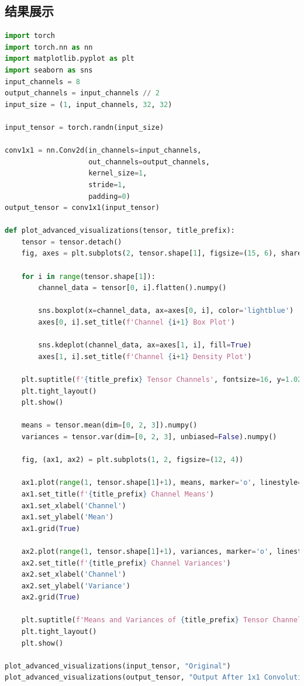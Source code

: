 \documentclass[a4paper,12pt]{article}
\begin{document}
\subsection{结果展示}
\begin{lstlisting}[language=Python]
import torch
import torch.nn as nn
import matplotlib.pyplot as plt
import seaborn as sns
input_channels = 8
output_channels = input_channels // 2  
input_size = (1, input_channels, 32, 32)  

input_tensor = torch.randn(input_size)

conv1x1 = nn.Conv2d(in_channels=input_channels, 
					out_channels=output_channels, 
					kernel_size=1, 
					stride=1, 
					padding=0)
output_tensor = conv1x1(input_tensor)

def plot_advanced_visualizations(tensor, title_prefix):
	tensor = tensor.detach() 
	fig, axes = plt.subplots(2, tensor.shape[1], figsize=(15, 6), sharex='col', gridspec_kw={'height_ratios': [1, 2]})

	for i in range(tensor.shape[1]):
		channel_data = tensor[0, i].flatten().numpy()

		sns.boxplot(x=channel_data, ax=axes[0, i], color='lightblue')
		axes[0, i].set_title(f'Channel {i+1} Box Plot')

		sns.kdeplot(channel_data, ax=axes[1, i], fill=True)
		axes[1, i].set_title(f'Channel {i+1} Density Plot')

	plt.suptitle(f'{title_prefix} Tensor Channels', fontsize=16, y=1.02)
	plt.tight_layout()
	plt.show()

	means = tensor.mean(dim=[0, 2, 3]).numpy()
	variances = tensor.var(dim=[0, 2, 3], unbiased=False).numpy()

	fig, (ax1, ax2) = plt.subplots(1, 2, figsize=(12, 4))

	ax1.plot(range(1, tensor.shape[1]+1), means, marker='o', linestyle='-', color='blue')
	ax1.set_title(f'{title_prefix} Channel Means')
	ax1.set_xlabel('Channel')
	ax1.set_ylabel('Mean')
	ax1.grid(True)

	ax2.plot(range(1, tensor.shape[1]+1), variances, marker='o', linestyle='-', color='red')
	ax2.set_title(f'{title_prefix} Channel Variances')
	ax2.set_xlabel('Channel')
	ax2.set_ylabel('Variance')
	ax2.grid(True)

	plt.suptitle(f'Means and Variances of {title_prefix} Tensor Channels', fontsize=16)
	plt.tight_layout()
	plt.show()

plot_advanced_visualizations(input_tensor, "Original")
plot_advanced_visualizations(output_tensor, "Output After 1x1 Convolution")
\end{lstlisting}
\end{document}
